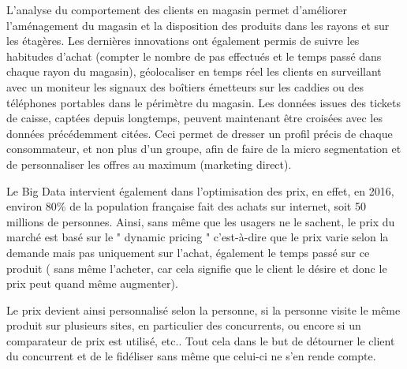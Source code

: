 \documentclass[12pt]{article}
\begin{document}
L’analyse du comportement des clients en magasin permet d’améliorer l’aménagement du magasin et la disposition des produits dans les rayons et sur les étagères. Les dernières innovations ont également permis de suivre les habitudes d’achat (compter le nombre de pas effectués et le temps passé dans chaque rayon du magasin), géolocaliser en temps réel les clients en surveillant avec un moniteur les signaux des boîtiers émetteurs sur les caddies ou des téléphones portables dans le périmètre du magasin. Les données issues des tickets de caisse, captées depuis longtemps, peuvent  maintenant être croisées avec les données précédemment citées. Ceci permet de dresser un profil précis de chaque consommateur, et non plus d’un groupe, afin de faire de la micro segmentation et de personnaliser les offres au maximum (marketing direct).\par
Le Big Data intervient également  dans l'optimisation des prix, en effet, en 2016, environ 80\% de la population française fait des achats sur internet, soit 50 millions de personnes. 
Ainsi, sans même que les usagers ne le sachent, le prix du marché est basé sur le " dynamic pricing " c'est-à-dire que le prix varie selon la demande mais pas uniquement sur l'achat, également le temps passé sur ce produit ( sans même l'acheter, car cela signifie que le client le désire et donc le prix peut quand même augmenter).\par
Le prix devient ainsi personnalisé selon la personne, si la personne visite le même produit sur plusieurs sites, en particulier des concurrents, ou encore si un comparateur de prix est utilisé, etc.. Tout cela dans le but de détourner le client du concurrent et de le fidéliser sans même que celui-ci ne s'en rende compte.\par
\end{document}
